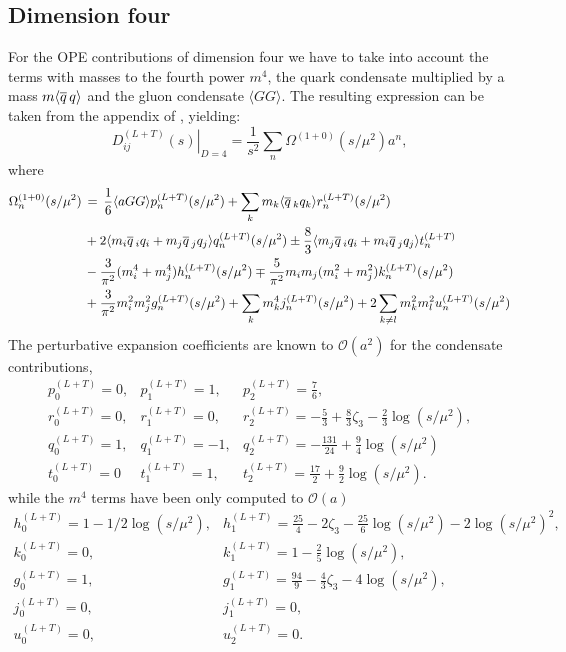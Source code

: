 \documentclass[../../index.tex]{subfiles}
\begin{document}
\subsection{Dimension four}
For the OPE contributions of dimension four we have to take into account the
terms with masses to the fourth power $m^4$, the quark condensate multiplied by
a mass $m \langle \overline{q}\, q \rangle$ and the gluon condensate $\langle GG
\rangle$. The resulting expression can be taken from the appendix of
\cite{Pich1999}, yielding:
\begin{equation}
  \left. D_{ij}^{(L+T)}(s) \right\rvert_{D=4} = \frac{1}{s^2} \sum_n \Omega^{(1+0)}(s/\mu^2)a^n,
\end{equation}
where
\begin{equation}
  \begin{split}
    \Omega_n^{(1+0)} (s/\mu^2) &\,=\, \frac{1}{6}\langle aGG \rangle p_n^{(L+T)}(s/\mu^2) + \sum_k m_k \langle \overline{q}\,_k q_k \rangle r_n^{(L+T)}(s/\mu^2) \\
    &\,+ 2\langle m_i \overline{q}\,_i q_i + m_j \overline{q}\,_j q_j \rangle q_n^{(L+T)} (s/\mu^2) \pm \frac{8}{3} \langle m_j \overline{q}\,_i q_i + m_i \overline{q}\,_j q_j \rangle t_n^{(L+T)} \\
    &\,- \frac{3}{\pi^2} (m_i^4 + m_j^4) h_n^{(L+T)} (s/\mu^2) \mp \frac{5}{\pi^2} m_i m_j (m_i^2 + m_j^2) k_n^{(L+T)}(s/\mu^2)\\
    &\,+ \frac{3}{\pi^2} m_i^2 m_j^2 g_n^{(L+T)}(s/\mu^2) + \sum_k m_k^4 j_n^{(L+T)}(s/\mu^2) + 2 \sum_{k \neq l} m_k^2 m_l^2 u_n^{(L+T)}(s/\mu^2)
  \end{split}
\end{equation}
The perturbative expansion coefficients are known to $\mathcal{O}(a^2)$ for the
condensate contributions,
\begin{equation}
  \begin{array}{lll}
    p_0^{(L+T)}=0, & p_1^{(L+T)}=1, & p_2^{(L+T)}=\frac{7}{6}, \\
    r_0^{(L+T)}=0, & r_1^{(L+T)}=0, & r_2^{(L+T)}=-\frac{5}{3}+\frac{8}{3}\zeta_3-\frac{2}{3}\log(s/\mu^2), \\
    q_0^{(L+T)}=1, & q_1^{(L+T)}=-1, & q_2^{(L+T)}=-\frac{131}{24}+\frac{9}{4}\log(s/\mu^2) \\
    t_0^{(L+T)}=0 & t_1^{(L+T)}=1, & t_2^{(L+T)}=\frac{17}{2}+\frac{9}{2}\log(s/\mu^2).
  \end{array}
\end{equation}
while the $m^4$ terms have been only computed to $\mathcal{O}(a)$
\begin{equation}
  \begin{array}{lll}
    h_0^{(L+T)}=1-1/2 \log(s/\mu^2), & h_1^{(L+T)}=\frac{25}{4}-2\zeta_3-\frac{25}{6}\log(s/\mu^2)-2 \log(s/\mu^2)^2, \\
    k_0^{(L+T)}=0, & k_1^{(L+T)}=1-\frac{2}{5}\log(s/\mu^2), \\
    g_0^{(L+T)}=1, & g_1^{(L+T)}=\frac{94}{9}-\frac{4}{3}\zeta_3-4 \log(s/\mu^2), \\
    j_0^{(L+T)}=0, & j_1^{(L+T)}=0, \\
    u_0^{(L+T)}=0, & u_2^{(L+T)}=0.
  \end{array}
\end{equation}
\end{document}

